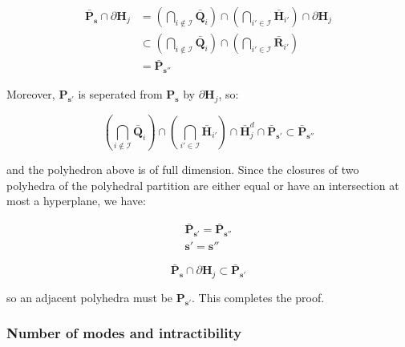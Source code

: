 \begin{equation}
\begin{array}{ll}
\bar{\textbf{P}}_{\boldsymbol s}\cap \partial \textbf{H}_{j} & =(\bigcap_{i\notin \mathcal{I}} \bar{\textbf{Q}}_{i})\cap(\bigcap_{i'\in \mathcal{I}}\bar{\textbf{H}}_{i'})\cap\partial \textbf{H}_{j}\\
 & \subset (\bigcap_{i\notin \mathcal{I}} \bar{\textbf{Q}}_{i})\cap (\bigcap_{i'\in \mathcal{I}}\bar{\textbf{R}}_{i'})\\
 & =\bar{\textbf{P}}_{\boldsymbol s''}
\end{array}
\label{eq:adjacency3}
\end{equation}

\noindent Moreover, $\textbf{P}_{\boldsymbol s'}$ is seperated from $\textbf{P}_{\boldsymbol s}$ by $\partial \textbf{H}_{j}$, so:

\begin{equation}
(\bigcap_{i\notin \mathcal{I}} \bar{\textbf{Q}}_{i})\cap(\bigcap_{i'\in \mathcal{I}}\bar{\textbf{H}}_{i'})\cap\bar{\textbf{H}}^{d}_{j}\cap \bar{\textbf{P}}_{\boldsymbol s'}\subset\bar{\textbf{P}}_{\boldsymbol s''}
\label{eq:adjacency4}
\end{equation}

\noindent and the polyhedron above is of full dimension. Since the closures of two polyhedra of the polyhedral partition are either equal or have an intersection at most a hyperplane, we have:

\begin{equation}
\begin{array}{l}
\bar{\textbf{P}}_{\boldsymbol s'}=\bar{\textbf{P}}_{\boldsymbol s''}\\
\boldsymbol s'=\boldsymbol s''
\end{array}
\label{eq:adjacency5}
\end{equation}

\begin{equation}
\bar{\textbf{P}}_{\boldsymbol s}\cap \partial \textbf{H}_{j}\subset \bar{\textbf{P}}_{\boldsymbol s'}
\label{eq:adjacency6}
\end{equation}

\noindent so an adjacent polyhedra must be $\textbf{P}_{\boldsymbol s'}$. This completes the proof.


\subsubsection{Number of modes and intractibility}\label{sec:modes}

